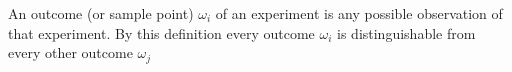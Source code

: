 An outcome (or sample point) $\omega_i$  of an experiment is any possible observation of that experiment. By this definition every outcome $\omega_i$ is distinguishable from every other outcome $\omega_j$
